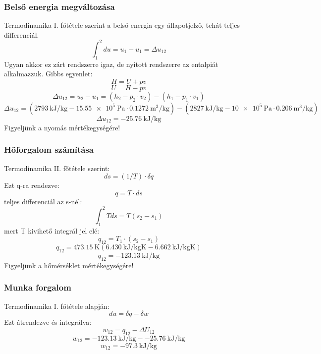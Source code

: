 \documentclass[11pt, a4paper]{report}
\begin{document}
		\subsubsection{Belső energia megváltozása}
			Termodinamika I. főtétele szerint a belső energia egy állapotjelző, tehát teljes differenciál.
			\[ \int_{1}^{2} du = u_1 - u_1 = \Delta u_{12}
			\]  
			Ugyan akkor ez zárt rendszerre igaz, de nyitott rendszerre az entalpiát alkalmazzuk. Gibbs egyenlet:
			\[ H=U+pv\]  
			\[U=H-pv\] 
			\begin{equation}
				\Delta u_{12} = u_2 - u_1 = \left(h_2 -p_2 \cdot v_2\right) - \left(h_1 -p_1 \cdot v_1\right) 				 
			\end{equation}
			\begin{equation}
				\Delta u_{12} = \left( \SI{2793}{\kilo\joule\per\kilogram} - \SI{15,55e5}{\pascal} \cdot \SI{0,1272}{\meter\cubed\per\kilogram} \right) - \left( \SI{2827}{\kilo\joule\per\kilogram} - \SI{10e5}{\pascal} \cdot \SI{0,206}{\meter\cubed\per\kilogram} \right) 
			\end{equation}
			\begin{equation}
				\Delta u_{12} = \SI{-25,76}{\kilo\joule\per\kilogram} 
			\end{equation}
                                Figyeljünk a nyomás mértékegységére!
		\subsubsection{Hőforgalom számítása}
			Termodinamika II. főtétele szerint:
			\[ ds=(1/T) \cdot  \delta q\] 
			Ezt q-ra rendezve:
			\[ q=T \cdot ds \]
			teljes differenciál az s-nél:
			\[ \int_{1}^{2} Tds= T(s_2-s_1) \]
			mert T kivihető integrál jel elé:
			\begin{equation}
				q_{12} = T_1 \cdot \left( s_2 - s_1\right) 
			\end{equation}   
			\begin{equation}
				q_{12} = \SI{473,15}{\kelvin} \left( \SI{6,430}{\kilo\joule\per\kilogram\kelvin} -\SI{6,662}{\kilo\joule\per\kilogram\kelvin}   \right) 
			\end{equation}
			\begin{equation}
				q_{12} = \SI{-123,13}{\kilo\joule\per\kilogram}
			\end{equation}	
                                 Figyeljünk a hőmérséklet mértékegységére!
		\subsubsection{Munka forgalom}
			Termodinamika I. főtétele alapján:
				\[ du = \delta q - \delta w \]
			Ezt átrendezve és integrálva:					 
			\begin{equation}
				w_{12} = q_{12}- \Delta U_{12} 
			\end{equation}	
			\begin{equation}
				w_{12} = \SI{-123,13}{\kilo\joule\per\kilogram} - \SI{-25,76}{\kilo\joule\per\kilogram} 
			\end{equation}	
			\begin{equation}
				w_{12} = \SI{-97,3}{\kilo\joule\per\kilogram}
			\end{equation}
\end{document}
